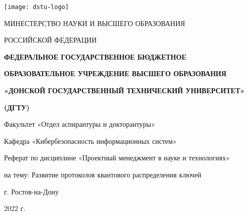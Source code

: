 \begin{titlepage}
\centerline{\texttt{[image: dstu-logo]}}
\vfill
\centerline{МИНЕСТЕРСТВО НАУКИ И ВЫСШЕГО ОБРАЗОВАНИЯ}
\centerline{РОССИЙСКОЙ ФЕДЕРАЦИИ}
\vfill
\centerline{\bf ФЕДЕРАЛЬНОЕ ГОСУДАРСТВЕННОЕ БЮДЖЕТНОЕ}
\centerline{\bf ОБРАЗОВАТЕЛЬНОЕ УЧРЕЖДЕНИЕ ВЫСШЕГО ОБРАЗОВАНИЯ}
\centerline{\bf «ДОНСКОЙ ГОСУДАРСТВЕННЫЙ ТЕХНИЧЕСКИЙ УНИВЕРСИТЕТ»}
\centerline{\bf (ДГТУ)}
\normalsize
\vfill\vfill
\centerline{Факультет «Отдел аспирантуры и докторантуры»}
\centerline{Кафедра «Кибербезопасность информационных систем»}
\vfill
\vfill
\centerline{Реферат по дисциплине «Проектный менеджмент в науке и технологиях»}
\centerline{на тему: Развитие протоколов квантового распределения ключей}
\vfill
\vfill
\vfill
\vfill
\vfill
\vfill
\vfill
\vfill
{}
\vfill
\vfill

\centerline{г. Ростов-на-Дону}
\centerline{2022 г.}

\end{titlepage}
\setcounter{page}{2}